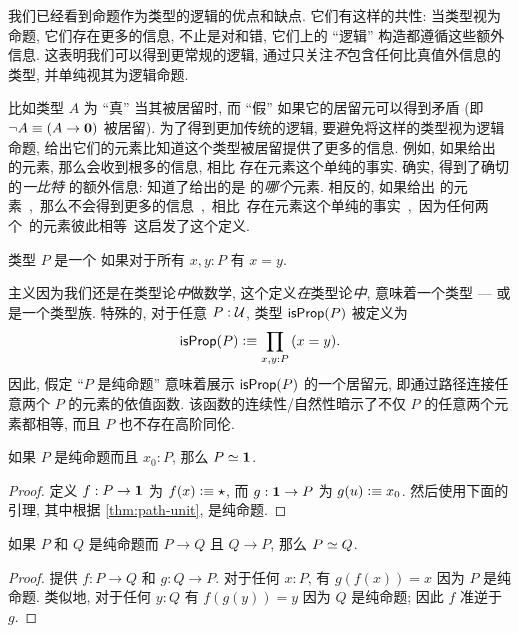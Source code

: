 %
%
%
我们已经看到命题作为类型的逻辑的优点和缺点.
它们有这样的共性: 当类型视为命题, 它们存在更多的信息, 不止是对和错, 它们上的 ``逻辑'' 构造都遵循这些额外信息.
这表明我们可以得到更常规的逻辑, 通过只关注\emph{不}包含任何比真值外信息的类型, 并单纯视其为逻辑命题.

比如类型 $A$ 为 ``真'' 当其被居留时, 而 ``假'' 如果它的居留元可以得到矛盾 (即 $\neg A \equiv (A\to\mathbf{0})$ 被居留).
%
为了得到更加传统的逻辑, 要避免将这样的类型视为逻辑命题, 给出它们的元素比知道这个类型被居留提供了更多的信息.
例如, 如果给出 \bool 的元素, 那么会收到根多的信息, 相比 \bool 存在元素这个单纯的事实.
确实, 得到了确切的\emph{一比特}
%
的额外信息: 知道了给出的是 \bool 的\emph{哪个}元素.
相反的, 如果给出 \unit 的元素, 那么不会得到更多的信息, 相比 \unit 存在元素这个单纯的事实, 因为任何两个 \unit 的元素彼此相等.
这启发了这个定义.

\begin{defn}\label{defn:isprop}
  类型 $P$ 是一个
  如果对于所有 $x,y:P$ 有 $x=y$.
\end{defn}

主义因为我们还是在类型论\emph{中}做数学, 这个定义\emph{在}类型论\emph{中}, 意味着一个类型 --- 或是一个类型族.
特殊的, 对于任意 $P:\mathcal{U}$, 类型 $\mathsf{isProp}(P)$ 被定义为
\[ \isprop(P) \defeq \prd{x,y:P} (x=y). \]
因此, 假定 ``$P$ 是纯命题'' 意味着展示 $\mathsf{isProp}(P)$ 的一个居留元, 即通过路径连接任意两个 $P$ 的元素的依值函数.
该函数的连续性/自然性暗示了不仅 $P$ 的任意两个元素都相等, 而且 $P$ 也不存在高阶同伦.

\begin{lem}\label{thm:inhabprop-eqvunit}
  如果 $P$ 是纯命题而且 $x_0:P$, 那么 $P \simeq \mathbf{1}$.
\end{lem}
\begin{proof}
  定义 $f:P\to\mathbf{1}$ 为 $f(x)\vcentcolon\equiv \star$, 而 $g:\mathbf{1}\to P$ 为 $g(u)\vcentcolon\equiv x_0$.
  然后使用下面的引理, 其中根据 \cref{thm:path-unit}, \unit 是纯命题.
\end{proof}

\begin{lem}\label{lem:equiv-iff-hprop}
  如果 $P$ 和 $Q$ 是纯命题而 $P\to Q$ 且 $Q\to P$, 那么 $P \simeq Q$.
\end{lem}
\begin{proof}
  提供 $f:P\to Q$ 和 $g:Q\to P$.
  对于任何 $x:P$, 有 $g(f(x))=x$ 因为 $P$ 是纯命题.
  类似地, 对于任何 $y:Q$ 有 $f(g(y))=y$ 因为 $Q$ 是纯命题; 因此 $f$ 准逆于 $g$.
\end{proof}

